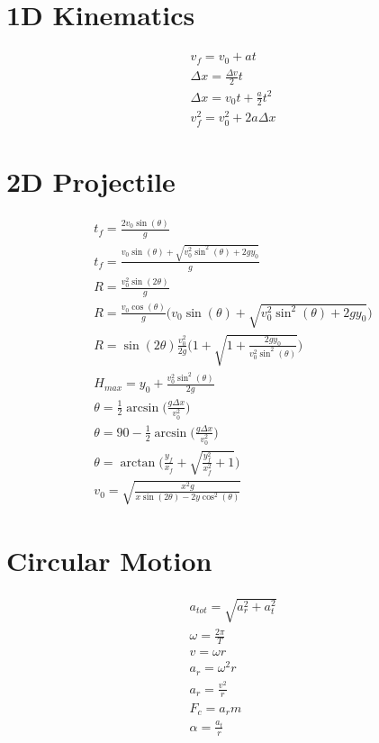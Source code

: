 \documentclass[12pt, letterpaper]{article}
\begin{document}
\section*{1D Kinematics}
\begin{align}
  v_f = v_0 + at \\
  \Delta x = \frac{\Delta v}{2}t \\
  \Delta x = v_0t + \frac{a}{2}t^2 \\
  v_f^2 = v_0^2 + 2a\Delta x
\end{align}

\section*{2D Projectile}
\begin{align}
  t_f = \frac{2v_0\sin{(\theta)}}{g} \\
  t_f = \frac{v_0\sin{(\theta)} + \sqrt{v_0^2\sin^2{(\theta)} + 2gy_0}}{g} \\
  R = \frac{v_0^2 \sin{(2\theta)}}{g} \\
  R = \frac{v_0\cos{(\theta)}}{g}\biggl(v_0\sin{(\theta)} + \sqrt{v_0^2\sin^2{(\theta)} + 2gy_0}\biggr) \\
  R = \sin{(2\theta)}\frac{v_0^2}{2g}\biggl(1 + \sqrt{1 + \frac{2gy_0}{v_0^2\sin^2{(\theta)}}}\biggr) \\
  H_{max} = y_0 + \frac{v_0^2\sin^2{(\theta)}}{2g} \\
  \theta = \frac{1}{2}\arcsin{\biggl(\frac{g\Delta x}{v_0^2}\biggr)} \\
  \theta = 90 - \frac{1}{2}\arcsin{\biggl(\frac{g\Delta x}{v_0^2}\biggr)} \\
  \theta = \arctan{\biggl(\frac{y_f}{x_f} + \sqrt{\frac{y_f^2}{x_f^2}+1}\biggr)} \\
  v_0 = \sqrt{\frac{x^2g}{x\sin{(2\theta)} - 2y\cos^2{(\theta)}}}
\end{align}

\section*{Circular Motion}
\begin{align}
  a_{tot} = \sqrt{a_r^2 + a_t^2} \\
  \omega = \frac{2\pi}{T} \\
  v = \omega r \\
  a_r = \omega^2r \\
  a_r = \frac{v^2}{r} \\
  F_c = a_rm \\
  \alpha = \frac{a_t}{r}
\end{align}
\end{document}
